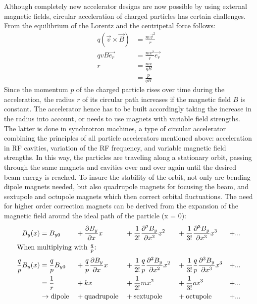 Although completely new accelerator designs are now possible by using external magnetic fields, circular acceleration of charged particles has certain challenges.
From the equilibrium of the Lorentz and the centripetal force follows:
\begin{align}
q(\vec{v}\times \vec{B}) &= \frac{m\vec{v}^2}{r}\\
qvB\vec{e_r} &= \frac{mv^2}{r}\vec{e_r} \nonumber \\
 r&=\frac{mv}{qB}\\
 &=\frac{p}{qB}\label{eq:MagField_Radius}
\end{align}
Since the momentum $p$ of the charged particle rises over time during the acceleration, the radius $r$ of its circular path increases if the magnetic field $B$ is constant.
The accelerator hence has to be built accordingly taking the increase in the radius into account, or needs to use magnets with variable field strengths.
The latter is done in synchrotron machines, a type of circular accelerator combining the principles of all particle accelerators mentioned above: acceleration in RF cavities, variation of the RF frequency, and variable magnetic field strengths.
In this way, the particles are traveling along a stationary orbit, passing through the same magnets and cavities over and over again until the desired beam energy is reached.
To insure the stability of the orbit, not only are bending dipole magnets needed, but also quadrupole magnets for focusing the beam, and sextupole and octupole magnets which then correct orbital fluctuations.
The need for higher order correction magnets can be derived from the expansion of the magnetic field around the ideal path of the particle (x = 0):
\begin{alignat}{5}
 B_y(x) &= B_{y0} &&+ \frac{\partial B_y}{\partial x}x &&+ \frac{1}{2!}\frac{\partial^2 B_y}{\partial x^2}x^2 &&+ \frac{1}{3!}\frac{\partial^3 B_y}{\partial x^3}x^3 &+ ...\\
 \intertext{When multiplying with $\frac{q}{p}$:}
 \frac{q}{p}B_y(x) &= \frac{q}{p}B_{y0} &&+ \frac{q}{p}\frac{\partial B_y}{\partial x}x &&+  \frac{1}{2!}\frac{q}{p}\frac{\partial^2 B_y}{\partial x^2}x^2 &&+ \frac{1}{3!}\frac{q}{p}\frac{\partial^3 B_y}{\partial x^3}x^3 &+ ...\\
  &= \frac{1}{r} &&+ kx &&+ \frac{1}{2!}mx^2 &&+ \frac{1}{3!}ox^3 &+ ... \label{eq:field_components}\\
  &\rightarrow \textnormal{dipole} &&+ \textnormal{quadrupole} &&+ \textnormal{sextupole} &&+ \textnormal{octupole} &+ ...\nonumber
\end{alignat}
